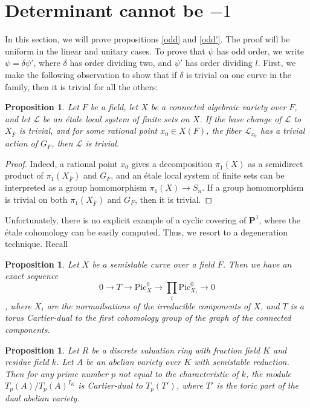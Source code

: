 \documentclass{article}
\newtheorem{proposition}[theorem]{Proposition}
\theoremstyle{definition}
\DeclareMathOperator{\et}{\mathrm{\acute{e}t}}
\begin{document}
	\section{Determinant cannot be $-1$}
	In this section, we will prove propositions \ref{odd} and \ref{odd'}. The proof will be uniform in the linear and unitary cases.
	To prove that $\psi$ has odd order, we write $\psi = \delta \psi'$, where $\delta$ has order dividing two, and $\psi'$ has order dividing $l$. First, we make the following observation to show that if $\delta$ is trivial on one curve in the family, then it is trivial for all the others:
	\begin{proposition} \label{indep}
		Let $F$ be a field, let $X$ be a connected algebraic variety over $F$, and let $\mathcal{L}$ be an \'etale local system of finite sets on $X$. If the base change of $\mathcal{L}$ to $X_{\overline{F}}$ is trivial, and for some rational point $x_0 \in X(F)$, the fiber $\mathcal{L}_{x_0}$ has a trivial action of $G_F$, then $\mathcal{L}$ is trivial.
	\end{proposition}
	\begin{proof}
		Indeed, a rational point $x_0$ gives a decomposition $\pi_1^{\et}(X)$ as a semidirect product of $\pi_1^{\et}(X_{\overline{F}})$ and $G_F$, and an \'etale local system of finite sets can be interpreted as a group homomorphism $\pi_1^{\et}(X) \to S_n$. If a group homomorphism is trivial on both $\pi_1^{\et}(X_{\overline{F}})$ and $G_F$, then it is trivial.
	\end{proof}
	Unfortunately, there is no explicit example of a cyclic covering of $\mathbf{P}^1$, where the \'etale cohomology can be easily computed. Thus, we resort to a degeneration technique. Recall 
	\begin{proposition} \cite[9.2.2, example 8]{neron}
		Let $X$ be a semistable curve over a field $F$. Then we have an exact sequence 
		$$0 \to T \to  \mathrm{Pic}^0_X \to \prod_i \mathrm{Pic}^0_{X_i} \to 0$$, where $X_i$ are the normailsations of the irreducible components of $X$, and $T$ is a torus Cartier-dual to the first cohomology group of the graph of the connected components.
	\end{proposition}
	\begin{proposition} \cite[Proposition 2.2.5]{sga}
		Let $R$ be a discrete valuation ring with fraction field $K$ and residue field $k$. Let $A$ be an abelian variety over $K$ with semistable reduction. Then for any prime number $p$ not equal to the characteristic of $k$, the module $T_p(A)/T_p(A)^{I_K}$ is Cartier-dual to $T_p(T')$, where $T'$ is the toric part of the dual abelian variety.
	\end{proposition}
\end{document}
